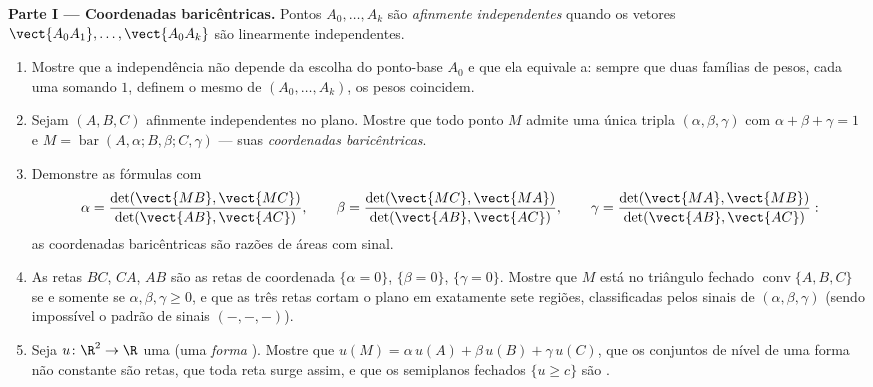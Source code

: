 \begin{problem}
\medskip
\noindent\textbf{Parte I --- Coordenadas baricêntricas.} Pontos
$A_0, \dots, A_k$ são \emph{afinmente independentes} quando os
vetores $\vect{A_0A_1}, \dots, \vect{A_0A_k}$ são linearmente
independentes.
\begin{enumerate}
  \item Mostre que a independência  não depende da
        escolha do ponto-base $A_0$ e que ela equivale a: sempre
        que duas famílias de pesos, cada uma somando $1$, definem
        o mesmo  de $(A_0,
        \dots, A_k)$, os pesos coincidem.
  \item Sejam $(A, B, C)$ afinmente independentes no plano.
        Mostre que todo ponto $M$ admite uma única tripla
        $(\alpha, \beta, \gamma)$ com $\alpha + \beta +
        \gamma = 1$ e $M = \operatorname{bar}(A, \alpha; B,
        \beta; C, \gamma)$ --- suas \emph{coordenadas
        baricêntricas}.
  \item Demonstre as fórmulas com 
        \[
        \alpha = \frac{\det(\vect{MB},
        \vect{MC})}{\det(\vect{AB}, \vect{AC})},
        \qquad
        \beta = \frac{\det(\vect{MC},
        \vect{MA})}{\det(\vect{AB}, \vect{AC})},
        \qquad
        \gamma = \frac{\det(\vect{MA},
        \vect{MB})}{\det(\vect{AB}, \vect{AC})} :
        \]
        as coordenadas baricêntricas são razões de áreas com sinal.
  \item As retas $BC$, $CA$, $AB$ são as retas de coordenada
        $\{\alpha = 0\}$, $\{\beta = 0\}$, $\{\gamma = 0\}$.
        Mostre que $M$ está no triângulo fechado
        $\operatorname{conv}\{A, B, C\}$ se e somente se $\alpha, \beta,
        \gamma \geq 0$, e que as três retas cortam o plano
        em exatamente sete regiões, classificadas pelos sinais de
        $(\alpha, \beta, \gamma)$ (sendo impossível o padrão de sinais $(-, -,
        -)$).
  \item Seja $u \colon \R^2 \to \R$ uma  (uma
        \emph{forma }). Mostre que $u(M) = \alpha\,u(A) +
        \beta\,u(B) + \gamma\,u(C)$, que os conjuntos de nível de uma
        forma  não constante são retas, que toda reta
        surge assim, e que os semiplanos fechados $\{u
        \geq c\}$ são .
\end{enumerate}


\end{problem}
